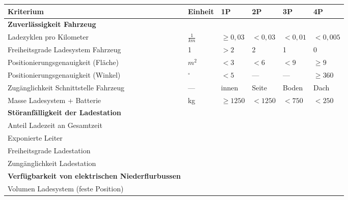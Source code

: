 \begin{table}
	\centering
	\begin{tabulary}{\linewidth}{LLllll}
		\toprule
		Kriterium                                                & Einheit        & 1P         & 2P      & 3P      & 4P        \\ \midrule
		\textbf{Zuverlässigkeit Fahrzeug}                        &                &            &         &         &  \\
		Ladezyklen pro Kilometer                                 & $\frac{1}{km}$ & $\ge 0,03$ & $<0,03$ & $<0,01$ & $<0,005$  \\
		Freiheitsgrade Ladesystem Fahrzeug                       & 1              & $>2$       & 2       & 1       & 0         \\
		Positionierungsgenauigkeit (Fläche)                      & $m^2$          & $<3$       & $<6$    & $<9$    & $\ge 9$   \\
		Positionierungsgenauigkeit (Winkel)                      & $^\circ$       & $<5$       & ---     & ---     & $\ge 360$ \\
		Zugänglichkeit Schnittstelle Fahrzeug                    & ---          & innen      & Seite   & Boden   & Dach      \\
		Masse Ladesystem + Batterie                              & kg             & $\ge 1250$ & $<1250$ & $<750$  & $<250$    \\ \midrule
		\textbf{Störanfälligkeit der Ladestation}                &                &            &         &         &  \\
		Anteil Ladezeit an Gesamtzeit                            &                &            &         &         &  \\
		Exponierte Leiter                                        &                &            &         &         &  \\
		Freiheitsgrade Ladestation                               &                &            &         &         &  \\
		Zungänglichkeit Ladestation                              &                &            &         &         &  \\ \midrule
		\textbf{Verfügbarkeit von elektrischen Niederflurbussen} &                &            &         &         &  \\
		Volumen Ladesystem (feste Position)                      &                &            &         &         &  \\

\end{tabulary}
\end{table}
